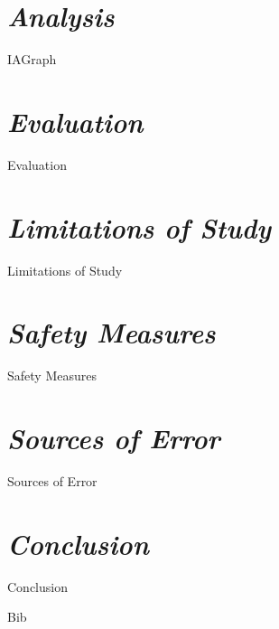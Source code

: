 \documentclass[12pt, a4paper]{article}
\begin{document}
        
\section{\textit{Analysis}}
        

			{IAGraph}
        
        
\section{\textit{Evaluation}}
        
        {Evaluation}
        
\section{\textit{Limitations of Study}}
        
        {Limitations of Study}
    
\section{\textit{Safety Measures}}
        
        {Safety Measures} 
                
\section{\textit{Sources of Error}}
        
        {Sources of Error}
        
\section{\textit{Conclusion}}
        
        {Conclusion}
        

        
\clearpage

{Bib}


\clearpage


\end{document}
